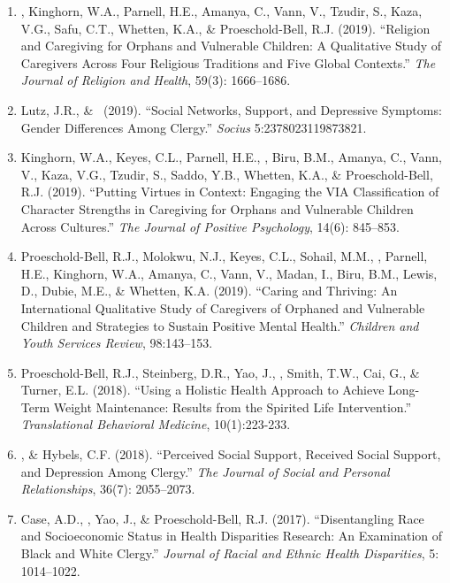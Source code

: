 \begin{enumerate}
\item \Eagle, Kinghorn, W.A., Parnell, H.E., Amanya, C., Vann, V., Tzudir, S., Kaza, V.G., Safu, C.T., Whetten, K.A., \& Proeschold-Bell, R.J. (2019). ``Religion and Caregiving for Orphans and Vulnerable Children: A Qualitative Study of Caregivers Across Four Religious Traditions and Five Global Contexts.'' \emph{The Journal of Religion and Health}, 59(3): 1666--1686. 

\item Lutz, J.R., \& \Eagle\CS\ (2019). ``Social Networks, Support, and Depressive Symptoms: Gender Differences Among Clergy.'' \emph{Socius} 5:2378023119873821. 

\item Kinghorn, W.A., Keyes, C.L., Parnell, H.E., \Eagle, Biru, B.M., Amanya, C., Vann, V., Kaza, V.G., Tzudir, S., Saddo, Y.B., Whetten, K.A., \& Proeschold-Bell, R.J. (2019). ``Putting Virtues in Context: Engaging the VIA Classification of Character Strengths in Caregiving for Orphans and Vulnerable Children Across Cultures.'' \emph{The Journal of Positive Psychology}, 14(6): 845--853. 

\item Proeschold-Bell, R.J., Molokwu, N.J., Keyes, C.L., Sohail, M.M., \Eagle, Parnell, H.E., Kinghorn, W.A., Amanya, C., Vann, V., Madan, I., Biru, B.M., Lewis, D., Dubie, M.E., \& Whetten, K.A. (2019). ``Caring and Thriving: An International Qualitative Study of Caregivers of Orphaned and Vulnerable Children and Strategies to Sustain Positive Mental Health.'' \emph{Children and Youth Services Review}, 98:143--153. 

\item Proeschold-Bell, R.J., Steinberg, D.R., Yao, J., \Eagle, Smith, T.W., Cai, G., \& Turner, E.L. (2018). ``Using a Holistic Health Approach to Achieve Long-Term Weight Maintenance: Results from the Spirited Life Intervention.'' \emph{Translational Behavioral Medicine}, 10(1):223-233. 

\item \Eagle, \& Hybels, C.F. (2018). ``Perceived Social Support, Received Social Support, and Depression Among Clergy.'' \emph{The Journal of Social and Personal Relationships}, 36(7): 2055--2073. 

\item Case, A.D., \Eagle, Yao, J., \& Proeschold-Bell, R.J. (2017). ``Disentangling Race and Socioeconomic Status in Health Disparities Research: An Examination of Black and White Clergy.'' \emph{Journal of Racial and Ethnic Health Disparities}, 5: 1014--1022. 


\end{enumerate}
